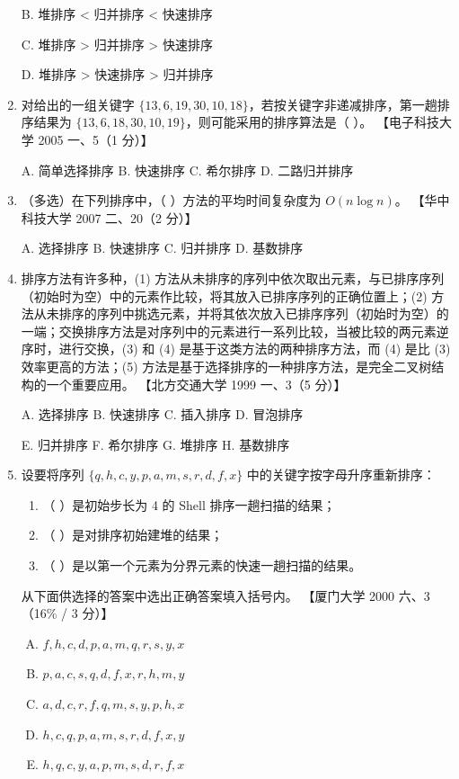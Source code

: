 \documentclass[lang=cn,newtx,10pt,scheme=chinese]{../../elegantbook}
\begin{document}
\begin{enumerate}
    B. 堆排序 < 归并排序 < 快速排序  

    C. 堆排序 > 归并排序 > 快速排序  

    D. 堆排序 > 快速排序 > 归并排序  

    \item 对给出的一组关键字 $\{13, 6, 19, 30, 10, 18\}$，若按关键字非递减排序，第一趟排序结果为 $\{13, 6, 18, 30, 10, 19\}$，则可能采用的排序算法是（ ）。  
    【电子科技大学 2005 一、5（1 分）】  

    A. 简单选择排序 \quad B. 快速排序 \quad C. 希尔排序 \quad D. 二路归并排序  

    \item （多选）在下列排序中，（ ）方法的平均时间复杂度为 $O(n \log n)$。  
    【华中科技大学 2007 二、20（2 分）】  

    A. 选择排序 \quad B. 快速排序 \quad C. 归并排序 \quad D. 基数排序 

    \item 排序方法有许多种，(1) 方法从未排序的序列中依次取出元素，与已排序序列（初始时为空）中的元素作比较，将其放入已排序序列的正确位置上；(2) 方法从未排序的序列中挑选元素，并将其依次放入已排序序列（初始时为空）的一端；交换排序方法是对序列中的元素进行一系列比较，当被比较的两元素逆序时，进行交换，(3) 和 (4) 是基于这类方法的两种排序方法，而 (4) 是比 (3) 效率更高的方法；(5) 方法是基于选择排序的一种排序方法，是完全二叉树结构的一个重要应用。  
    【北方交通大学 1999 一、3（5 分）】 

    A. 选择排序 \quad B. 快速排序 \quad C. 插入排序 \quad D. 冒泡排序  
    
    E. 归并排序 \quad F. 希尔排序 \quad G. 堆排序 \quad H. 基数排序  

    \item 设要将序列 $\{q, h, c, y, p, a, m, s, r, d, f, x\}$ 中的关键字按字母升序重新排序：

    \begin{enumerate}
        \item （ ）是初始步长为 4 的 Shell 排序一趟扫描的结果；
        \item （ ）是对排序初始建堆的结果；
        \item （ ）是以第一个元素为分界元素的快速一趟扫描的结果。
    \end{enumerate}

    从下面供选择的答案中选出正确答案填入括号内。  
    【厦门大学 2000 六、3（16\% / 3 分）】

    \begin{enumerate}[A.]
        \item $f, h, c, d, p, a, m, q, r, s, y, x$
        \item $p, a, c, s, q, d, f, x, r, h, m, y$
        \item $a, d, c, r, f, q, m, s, y, p, h, x$
        \item $h, c, q, p, a, m, s, r, d, f, x, y$
        \item $h,q,c, y, a, p, m, s, d, r, f, x$
    \end{enumerate}


\end{enumerate}
\end{document}

